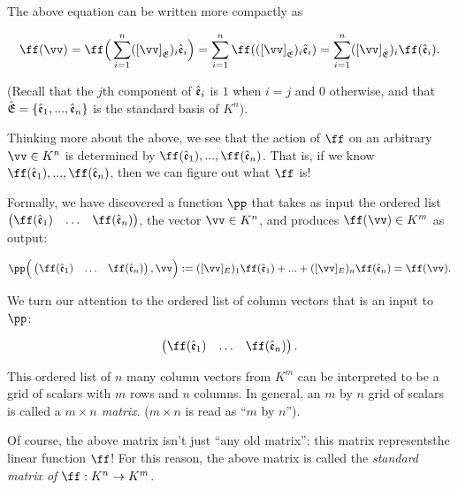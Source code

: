 \begin{deriv}
    The above equation can be written more compactly as
    
    \begin{align*}
        \ff(\vv) = \ff\Big( \sum_{i = 1}^n ([\vv]_\sE)_i \see_i \Big) = \sum_{i = 1}^n \ff(([\vv]_\sE)_i \see_i) = \sum_{i = 1}^n ([\vv]_\sE)_i \ff(\see_i).
    \end{align*}
    
    (Recall that the $j$th component of $\hat{\mathfrak{e}}_i$ is $1$ when $i = j$ and $0$ otherwise, and that ${\hat{\mathfrak{E}}} = \{\hat{\mathfrak{e}}_1, ..., \hat{\mathfrak{e}}_n\}$ is the standard basis of $K^n$).
    
    Thinking more about the above, we see that the action of $\ff$ on an arbitrary $\vv \in K^n$ is determined by $\ff(\see_1), ..., \ff(\see_n)$. That is, if we know $\ff(\see_1), ..., \ff(\see_n)$, then we can figure out what $\ff$ is!
    
    Formally, we have discovered a function $\pp$ that takes as input the ordered list $\begin{pmatrix} \ff(\see_1) & \hdots & \ff(\see_n) \end{pmatrix}$, the vector $\vv \in K^n$, and produces $\ff(\vv) \in K^m$ as output:
    
    \begin{align*}
        \pp\Big( \begin{pmatrix} \ff(\see_1) & \hdots & \ff(\see_n) \end{pmatrix}, \vv \Big) := ([\vv]_E)_1 \ff(\see_1) + ... + ([\vv]_E)_n \ff(\see_n) = \ff(\vv).
    \end{align*}
    
    We turn our attention to the ordered list of column vectors that is an input to $\pp$:
    
    \begin{align*}
        \begin{pmatrix} 
            \ff(\see_1) & \hdots & \ff(\see_n)
        \end{pmatrix}.
    \end{align*}
    
    This ordered list of $n$ many column vectors from $K^m$ can be interpreted to be a grid of scalars with $m$ rows and $n$ columns. In general, an $m$ by $n$ grid of scalars is called a \textit{$m \times n$ matrix}. ($m \times n$ is read as ``$m$ by $n$'').
    
    Of course, the above matrix isn't just ``any old matrix'': this matrix represents\footnotemark the linear function $\ff$! For this reason, the above matrix is called the \textit{standard matrix of $\ff:K^n \rightarrow K^m$}.
    
\end{deriv}

